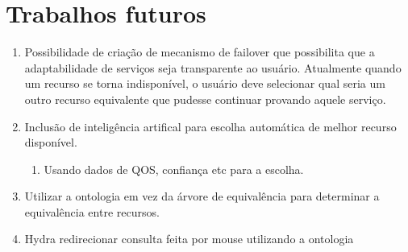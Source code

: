 \section{Trabalhos futuros}

\begin{enumerate}
	\item Possibilidade de criação de mecanismo de failover que possibilita que a adaptabilidade de serviços seja transparente ao usuário. Atualmente quando um recurso se torna indisponível, o usuário deve selecionar qual seria um outro recurso equivalente que pudesse continuar provando aquele serviço. 
	\item Inclusão de inteligência artifical para escolha automática de melhor recurso disponível.
		\begin{enumerate}
			\item Usando dados de QOS, confiança etc para a escolha.
		\end{enumerate}
	\item Utilizar a ontologia em vez da árvore de equivalência para determinar a equivalência entre recursos.
	\item Hydra redirecionar consulta feita por mouse utilizando a ontologia
\end{enumerate}